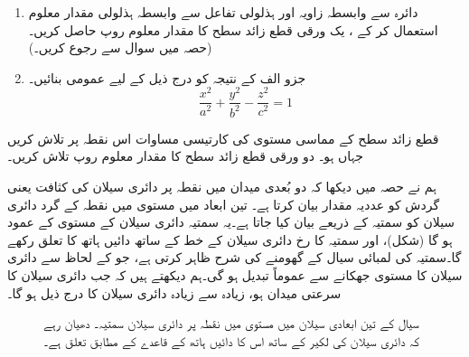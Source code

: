 \begin{enumerate}
\item[(الف)] 
  دائرہ   سے وابسطہ  زاویہ  اور  ہذلولی تفاعل     سے وابسطہ ہذلولی مقدار معلوم    استعمال کر کے ، یک ورقی قطع زائد سطح   کا مقدار معلوم روپ حاصل  کریں۔ (حصہ  میں سوال  سے رجوع کریں۔)
\item[(ب)] 
جزو الف کے نتیجہ کو   درج ذیل کے لیے عمومی بنائیں۔
\[
\frac{x^2}{a^2}+\frac{y^2}{b^2}-\frac{z^2}{c^2}=1
\]
\end{enumerate}
\quad
قطع زائد سطح   کے مماسی مستوی   کی کارتیسی مساوات اس نقطہ  پر تلاش کریں جہاں  ہو۔
\quad
دو ورقی قطع زائد سطح  کا مقدار معلوم روپ تلاش کریں۔



ہم نے  حصہ میں دیکھا کہ دو بُعدی میدان   میں  نقطہ    پر   دائری سیلان  کی کثافت یعنی    گردش  کو    عددیہ  مقدار    بیان کرتا ہے۔ تین  ابعاد  میں  مستوی میں نقطہ  کے گرد دائری سیلان   کو   سمتیہ کے ذریعے بیان کیا جاتا ہے۔یہ سمتیہ  دائری  سیلان کے مستوی  کے  عمود ہو گا  (شکل)، اور سمتیہ  کا رخ دائری سیلان   کے خط    کے ساتھ دائیں ہاتھ کا تعلق رکھے گا۔سمتیہ کی لمبائی  سیال کے گھومنے کی شرح ظاہر کرتی ہے، جو    کے لحاظ سے دائری سیلان کا مستوی  جھکانے سے  عموماً  تبدیل ہو گی۔ہم  دیکھتے ہیں کہ  جب دائری سیلان کا سرعتی میدان   ہو،  زیادہ سے زیادہ دائری سیلان کا      درج ذیل  ہو گا۔

\begin{figure}
\centering
{}
\caption
{سیال کے  تین ابعادی  سیلان  میں مستوی میں نقطہ  پر دائری سیلان سمتیہ۔ دھیان رہے کہ دائری سیلان کی لکیر کے ساتھ اس کا دائیں ہاتھ کے  قاعدے کے مطابق تعلق ہے۔}
\label{شکل_گردش_نقطہ_پر_بیان_سمتیہ}
\end{figure}


